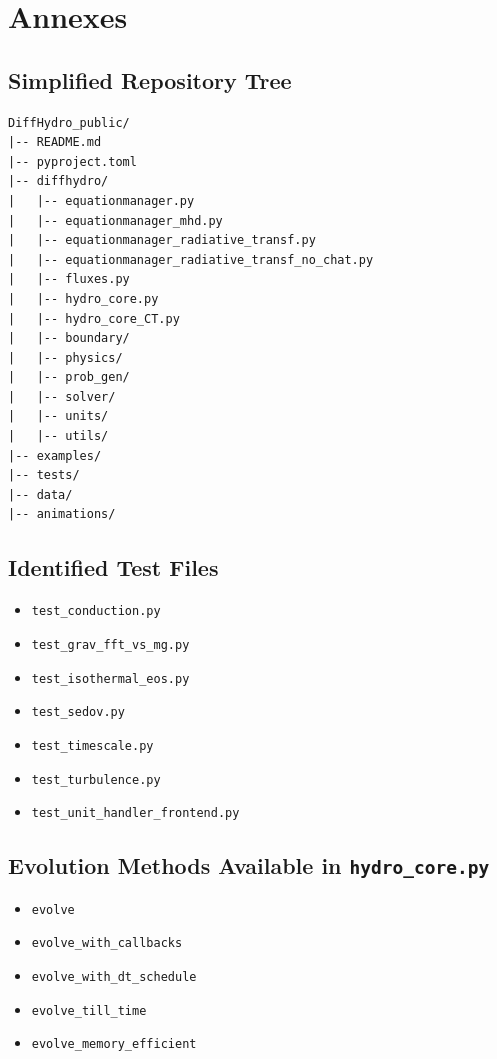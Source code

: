 \documentclass[a4paper, 11pt]{article}
\begin{document}
\newpage

\section{Annexes}

\subsection{Simplified Repository Tree}
\begin{verbatim}
DiffHydro_public/
|-- README.md
|-- pyproject.toml
|-- diffhydro/
|   |-- equationmanager.py
|   |-- equationmanager_mhd.py
|   |-- equationmanager_radiative_transf.py
|   |-- equationmanager_radiative_transf_no_chat.py
|   |-- fluxes.py
|   |-- hydro_core.py
|   |-- hydro_core_CT.py
|   |-- boundary/
|   |-- physics/
|   |-- prob_gen/
|   |-- solver/
|   |-- units/
|   |-- utils/
|-- examples/
|-- tests/
|-- data/
|-- animations/
\end{verbatim}

\subsection{Identified Test Files}
\begin{itemize}
    \item \texttt{test\_conduction.py}
    \item \texttt{test\_grav\_fft\_vs\_mg.py}
    \item \texttt{test\_isothermal\_eos.py}
    \item \texttt{test\_sedov.py}
    \item \texttt{test\_timescale.py}
    \item \texttt{test\_turbulence.py}
    \item \texttt{test\_unit\_handler\_frontend.py}
\end{itemize}

\subsection{Evolution Methods Available in \texttt{hydro\_core.py}}
\begin{itemize}
    \item \texttt{evolve}
    \item \texttt{evolve\_with\_callbacks}
    \item \texttt{evolve\_with\_dt\_schedule}
    \item \texttt{evolve\_till\_time}
    \item \texttt{evolve\_memory\_efficient}
\end{itemize}
\end{document}
